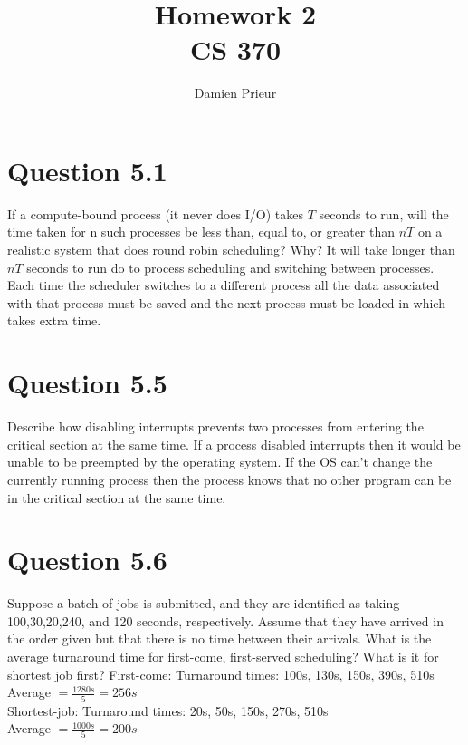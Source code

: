 \documentclass{article}
\author{Damien Prieur}
\title{Homework 2 \\ CS 370}
\date{}
\begin{document}
\maketitle

\section*{Question 5.1}
If a compute-bound process (it never does I/O) takes $T$ seconds to run, will the time taken for n such processes be less than, equal to, or greater than $nT$ on a realistic system that does round robin scheduling? Why?
\newline
\newline
It will take longer than $nT$ seconds to run do to process scheduling and switching between processes.
Each time the scheduler switches to a different process all the data associated with that process must be saved and the next process must be loaded in which takes extra time.

\section*{Question 5.5}
Describe how disabling interrupts prevents two processes from entering the critical section at the same time.
\newline
\newline
If a process disabled interrupts then it would be unable to be preempted by the operating system.
If the OS can't change the currently running process then the process knows that no other program can be in the critical section at the same time.

\section*{Question 5.6}
Suppose a batch of jobs is submitted, and they are identified as taking 100,30,20,240, and 120 seconds, respectively.
Assume that they have arrived in the order given but that there is no time between their arrivals.
What is the average turnaround time for first-come, first-served scheduling?
What is it for shortest job first?
\newline
\newline
First-come:
Turnaround times: 100s, 130s, 150s, 390s, 510s \\
Average $= \frac{1280s}{5} = 256s$ \\
Shortest-job:
Turnaround times: 20s, 50s, 150s, 270s, 510s \\
Average $= \frac{1000s}{5} = 200s$ \\
\end{document}

